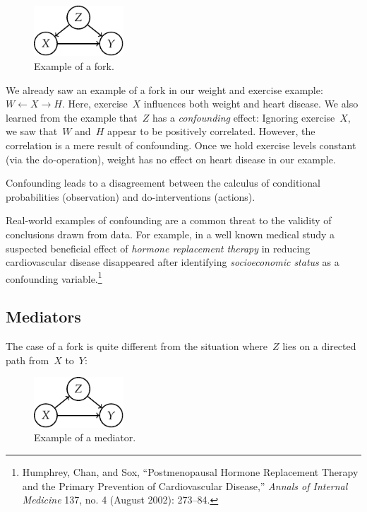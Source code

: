 \documentclass{tufte-book}
\begin{document}
\begin{figure}
\centering
\includegraphics[width=0.3\textwidth,height=\textheight]{assets/causal-conf}
\caption{Example of a fork.}
\end{figure}

We already saw an example of a fork in our weight and exercise example:
\(W\leftarrow X \rightarrow H\). Here, exercise~\(X\) influences both
weight and heart disease. We also learned from the example that~\(Z\)
has a \emph{confounding} effect: Ignoring
exercise~\(X\), we saw that~\(W\) and~\(H\) appear to be positively
correlated. However, the correlation is a mere result of confounding.
Once we hold exercise levels constant (via the do-operation), weight has
no effect on heart disease in our example.

Confounding leads to a disagreement between the calculus of conditional
probabilities (observation) and do-interventions (actions).

Real-world examples of confounding are a common threat to the validity
of conclusions drawn from data. For example, in a well known medical
study a suspected beneficial effect of \emph{hormone replacement
therapy} in reducing cardiovascular disease disappeared after
identifying \emph{socioeconomic status} as a confounding
variable.\footnote{Humphrey, Chan, and Sox, {``{Postmenopausal Hormone
  Replacement Therapy and the Primary Prevention of Cardiovascular
  Disease},''} \emph{Annals of Internal Medicine} 137, no. 4 (August
  2002): 273--84.}

\hypertarget{mediators}{%
\subsection{Mediators}\label{mediators}}

The case of a fork is quite different from the situation where~\(Z\)
lies on a directed path from~\(X\) to~\(Y\):

\begin{figure}
\centering
\includegraphics[width=0.3\textwidth,height=\textheight]{assets/causal-chain}
\caption{Example of a mediator.}
\end{figure}
\end{document}
